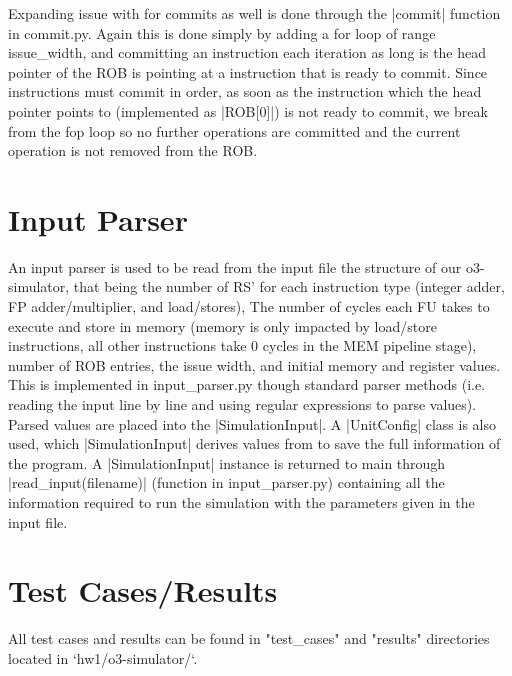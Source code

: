 \documentclass[12pt, twocolumn]{article}
\begin{document}
Expanding issue with for commits as well is done through the |commit| function in commit.py. Again this is done simply by adding a for loop of range issue\_width, and committing an instruction each iteration as long is the head pointer of the ROB is pointing at a instruction that is ready to commit. Since instructions must commit in order, as soon as the instruction which the head pointer points to (implemented as |ROB[0]|) is not ready to commit, we break from the fop loop so no further operations are committed and the current operation is not removed from the ROB.

\section{Input Parser}
An input parser is used to be read from the input file the structure of our o3-simulator, that being the number of RS' for each instruction type (integer adder, FP adder/multiplier, and load/stores), The number of cycles each FU takes to execute and store in memory (memory is only impacted by load/store instructions, all other instructions take 0 cycles in the MEM pipeline stage), number of ROB entries, the issue width, and initial memory and register values. This is implemented in input\_parser.py though standard parser methods (i.e. reading the input line by line and using regular expressions to parse values). Parsed values are placed into the |SimulationInput|. A |UnitConfig| class is also used, which |SimulationInput| derives values from to save the full information of the program. A |SimulationInput| instance is returned to main through |read_input(filename)| (function in input\_parser.py) containing all the information required to run the simulation with the parameters given in the input file.

\section{Test Cases/Results}
All test cases and results can be found in "test\_cases" and "results" directories located in `hw1/o3-simulator/`. 
\end{document}
